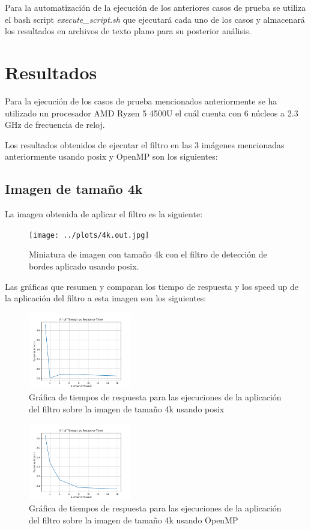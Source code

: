Para la automatización de la ejecución de los anteriores casos de prueba se utiliza el bash script \textit{execute\_script.sh} que ejecutará cada uno de los casos y almacenará los resultados en archivos de texto plano para su posterior análisis.

\section{Resultados}

Para la ejecución de los casos de prueba mencionados anteriormente se ha utilizado un procesador AMD Ryzen 5 4500U el cuál cuenta con 6 núcleos a 2.3 GHz de frecuencia de reloj.

Los resultados obtenidos de ejecutar el filtro en las 3 imágenes mencionadas anteriormente usando posix y OpenMP son los siguientes:

\subsection{Imagen de tamaño 4k}

La imagen obtenida de aplicar el filtro es la siguiente:

\begin{figure}[H]
    \centering
    \texttt{[image: ../plots/4k.out.jpg]}
    \caption{Miniatura de imagen con tamaño 4k con el filtro de detección de bordes aplicado usando posix.}
\end{figure}

Las gráficas que resumen y comparan los tiempo de respuesta y los speed up de la aplicación del filtro a esta imagen son los siguientes:

\begin{figure}[H]
    \centering
    \includegraphics[width=0.4\textwidth]{../plots/4k_response_time.png}
    \caption{Gráfica de tiempos de respuesta para las ejecuciones de la aplicación del filtro sobre la imagen de tamaño 4k usando posix}
\end{figure}

\begin{figure}[H]
    \centering
    \includegraphics[width=0.4\textwidth]{../plots/omp_4k_response_time.png}
    \caption{Gráfica de tiempos de respuesta para las ejecuciones de la aplicación del filtro sobre la imagen de tamaño 4k usando OpenMP}
\end{figure}

